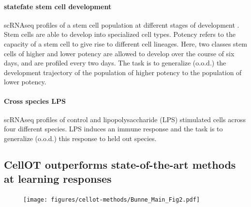 \paragraph{statefate stem cell development}
scRNAseq profiles of a stem cell population at different stages of development \cite{weinreb2020}.
Stem cells are able to develop into specialized cell types.
Potency refers to the capacity of a stem cell to give rise to different cell lineages.
Here, two classes stem cells of higher and lower potency are allowed to develop over the course of six days, and are profiled every two days.
The task is to generalize (o.o.d.) the development trajectory of the population of higher potency to the population of lower potency.

\paragraph{Cross species LPS}
scRNAseq profiles of control and lipopolysaccharide (LPS) stimulated cells across four different species.
LPS induces an immune response and 
the task is to generalize (o.o.d.) this response to held out species.

\subsection{CellOT outperforms state-of-the-art methods at learning responses}

\begin{figure}
  \begin{center}
    \texttt{[image: figures/cellot-methods/Bunne\_Main\_Fig2.pdf]}
  \end{center}
  \caption{}\label{fig:cellot-main-marginals}
\end{figure}

